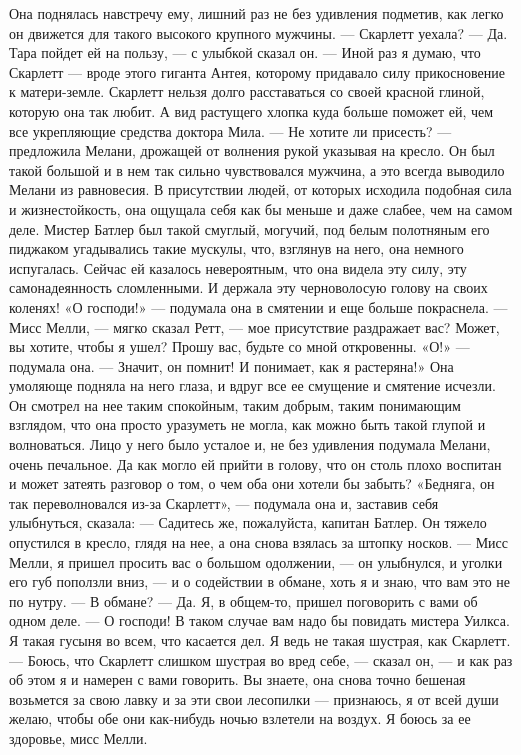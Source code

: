 Она поднялась навстречу ему, лишний раз не без удивления подметив, как легко он движется для такого высокого крупного мужчины.
— Скарлетт уехала?
— Да. Тара пойдет ей на пользу, — с улыбкой сказал он. — Иной раз я думаю, что Скарлетт — вроде этого гиганта Антея, которому придавало силу прикосновение к матери-земле. Скарлетт нельзя долго расставаться со своей красной глиной, которую она так любит. А вид растущего хлопка куда больше поможет ей, чем все укрепляющие средства доктора Мила.
— Не хотите ли присесть? — предложила Мелани, дрожащей от волнения рукой указывая на кресло. Он был такой большой и в нем так сильно чувствовался мужчина, а это всегда выводило Мелани из равновесия. В присутствии людей, от которых исходила подобная сила и жизнестойкость, она ощущала себя как бы меньше и даже слабее, чем на самом деле. Мистер Батлер был такой смуглый, могучий, под белым полотняным его пиджаком угадывались такие мускулы, что, взглянув на него, она немного испугалась. Сейчас ей казалось невероятным, что она видела эту силу, эту самонадеянность сломленными. И держала эту черноволосую голову на своих коленях!
«О господи!» — подумала она в смятении и еще больше покраснела.
— Мисс Мелли, — мягко сказал Ретт, — мое присутствие раздражает вас? Может, вы хотите, чтобы я ушел? Прошу вас, будьте со мной откровенны.
«О!» — подумала она. — Значит, он помнит! И понимает, как я растеряна!» Она умоляюще подняла на него глаза, и вдруг все ее смущение и смятение исчезли. Он смотрел на нее таким спокойным, таким добрым, таким понимающим взглядом, что она просто уразуметь не могла, как можно быть такой глупой и волноваться. Лицо у него было усталое и, не без удивления подумала Мелани, очень печальное. Да как могло ей прийти в голову, что он столь плохо воспитан и может затеять разговор о том, о чем оба они хотели бы забыть? «Бедняга, он так переволновался из-за Скарлетт», — подумала она и, заставив себя улыбнуться, сказала:
— Садитесь же, пожалуйста, капитан Батлер. Он тяжело опустился в кресло, глядя на нее, а она снова взялась за штопку носков. — Мисс Мелли, я пришел просить вас о большом одолжении, — он улыбнулся, и уголки его губ поползли вниз, — и о содействии в обмане, хоть я и знаю, что вам это не по нутру.
— В обмане?
— Да. Я, в общем-то, пришел поговорить с вами об одном деле.
— О господи! В таком случае вам надо бы повидать мистера Уилкса. Я такая гусыня во всем, что касается дел. Я ведь не такая шустрая, как Скарлетт.
— Боюсь, что Скарлетт слишком шустрая во вред себе, — сказал он, — и как раз об этом я и намерен с вами говорить. Вы знаете, она снова точно бешеная возьмется за свою лавку и за эти свои лесопилки — признаюсь, я от всей души желаю, чтобы обе они как-нибудь ночью взлетели на воздух. Я боюсь за ее здоровье, мисс Мелли.
